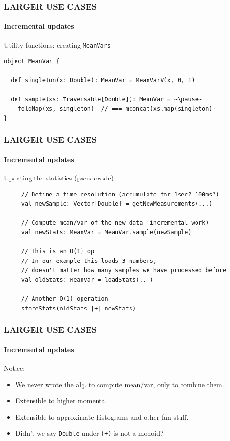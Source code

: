 \documentclass{beamer}
\begin{document}
\begin{frame}[fragile] \frametitle{LARGER USE CASES}
  \framesubtitle{Incremental updates}
  \begin{block}{Utility functions: creating \texttt{MeanVars}}
  \begin{lstlisting}
object MeanVar {

  def singleton(x: Double): MeanVar = MeanVarV(x, 0, 1)

  def sample(xs: Traversable[Double]): MeanVar = ~\pause~
    foldMap(xs, singleton)  // === mconcat(xs.map(singleton))
}
  \end{lstlisting}
  \end{block}
\end{frame}

\begin{frame}[fragile] \frametitle{LARGER USE CASES}
  \framesubtitle{Incremental updates}
  \begin{block}{Updating the statistics (pseudocode)}
  \begin{lstlisting}
     // Define a time resolution (accumulate for 1sec? 100ms?)
     val newSample: Vector[Double] = getNewMeasurements(...)

     // Compute mean/var of the new data (incremental work)
     val newStats: MeanVar = MeanVar.sample(newSample)

     // This is an O(1) op
     // In our example this loads 3 numbers,
     // doesn't matter how many samples we have processed before
     val oldStats: MeanVar = loadStats(...)

     // Another O(1) operation
     storeStats(oldStats |+| newStats)
  \end{lstlisting}
  \end{block}
\end{frame}


\begin{frame} \frametitle{LARGER USE CASES}
  \framesubtitle{Incremental updates}
  \begin{block}{Notice:}{}
  \begin{itemize}
    \item We never wrote the alg. to compute mean/var, only to combine them.
    \item Extensible to higher momenta.
    \item Extensible to approximate histograms and other fun stuff.
    \item Didn't we say \texttt{Double} under \texttt{(+)} is not a monoid?
  \end{itemize}
  \end{block}
\end{frame}
\end{document}
